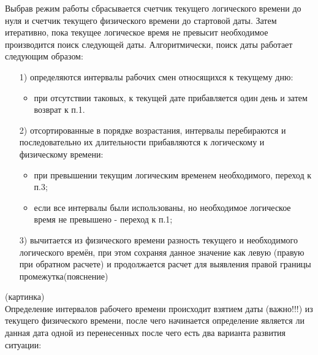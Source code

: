 Выбрав режим работы сбрасывается счетчик текущего логического времени до нуля и счетчик текущего физического времени до стартовой даты. Затем итеративно, пока текущее логическое время не превысит необходимое производится поиск следующей даты. Алгоритмически, поиск даты работает следующим образом:
\begin{enumerate}
	\item[1)] определяются интервалы рабочих смен относящихся к текущему дню:
	      \begin{itemize}
		      \item при отсутствии таковых, к текущей дате прибавляется один день и затем возврат к п.1.
	      \end{itemize}
	\item[2)] отсортированные в порядке возрастания, интервалы перебираются и последовательно их длительности прибавляются к логическому и физическому времени:
	      \begin{itemize}
		      \item при превышении текущим логическим временем необходимого, переход к п.3;
		      \item если все интервалы были использованы, но необходимое логическое время не превышено - переход к п.1;
	      \end{itemize}
	\item[3)] вычитается из физического времени разность текущего и необходимого логического времён, при этом сохраняя данное значение как левую (правую при обратном расчете) и продолжается расчет для выявления правой границы промежутка(пояснение)
\end{enumerate}
(картинка)\\
Определение интервалов рабочего времени происходит взятием даты (важно!!!) из текущего физического времени, после чего начинается определение является ли данная дата одной из перенесенных после чего есть два варианта развития ситуации:




